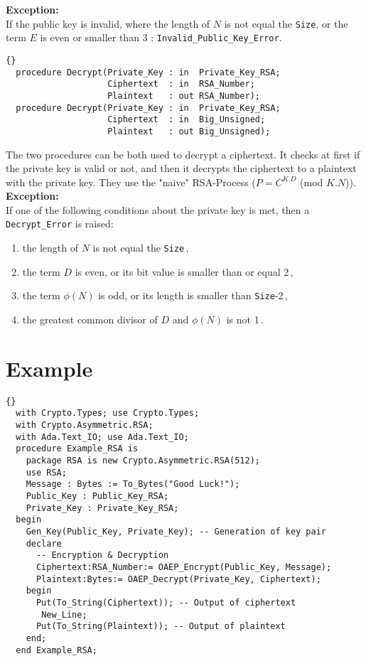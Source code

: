 \noindent\textbf{Exception:}\\
If the public key is invalid, where the length of $N$ is not equal the
\texttt{Size}, or the term $E$ is even or smaller than 3 :\quad
\texttt{Invalid\_Public\_Key\_Error}.

\hhline
\begin{lstlisting}{}
  procedure Decrypt(Private_Key : in  Private_Key_RSA;
                    Ciphertext  : in  RSA_Number;
                    Plaintext   : out RSA_Number);
  procedure Decrypt(Private_Key : in  Private_Key_RSA;
                    Ciphertext  : in  Big_Unsigned;
                    Plaintext   : out Big_Unsigned);
\end{lstlisting}
The two procedures can be both used to decrypt a ciphertext. It checks
at first if the private key is valid or not, and then it decrypts the
ciphertext to a plaintext with the private key. They use the "naive"
RSA-Process ($P=C^{K.D}$ (mod $K.N$)).\\

\noindent\textbf{Exception:}\\ If one of the following conditions
about the private key is met, then a \texttt{Decrypt\_Error} is
raised:
\begin{enumerate}
\item the length of $N$ is not equal the \texttt{Size}\,,
\item the term $D$ is even, or its bit value is smaller than or equal 2\,,
\item the term $\phi(N)$ is odd, or its length is smaller than \texttt{Size}-2\,,
\item the greatest common divisor of $D$ and $\phi(N)$ is not 1\,.
\end{enumerate}

\section{Example}
\begin{lstlisting}{}
  with Crypto.Types; use Crypto.Types;
  with Crypto.Asymmetric.RSA;
  with Ada.Text_IO; use Ada.Text_IO;
  procedure Example_RSA is
    package RSA is new Crypto.Asymmetric.RSA(512);
    use RSA;
    Message : Bytes := To_Bytes("Good Luck!");
    Public_Key : Public_Key_RSA;
    Private_Key : Private_Key_RSA;
  begin
    Gen_Key(Public_Key, Private_Key); -- Generation of key pair
    declare
      -- Encryption & Decryption
	  Ciphertext:RSA_Number:= OAEP_Encrypt(Public_Key, Message);
	  Plaintext:Bytes:= OAEP_Decrypt(Private_Key, Ciphertext);
    begin
      Put(To_String(Ciphertext)); -- Output of ciphertext
	   New_Line;
      Put(To_String(Plaintext)); -- Output of plaintext
    end;
  end Example_RSA;
\end{lstlisting}
